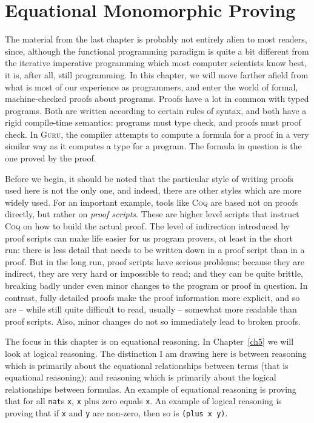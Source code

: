 \documentclass{book}[12pt]
\newcommand{\guru}[0]{\textsc{Guru}\xspace}
\begin{document}
\chapter{Equational Monomorphic Proving}
\label{ch2}

The material from the last chapter is probably not entirely alien to
most readers, since, although the functional programming paradigm is
quite a bit different from the iterative imperative programming which
most computer scientists know best, it is, after all, still
programming.  In this chapter, we will move farther afield from what
is most of our experience as programmers, and enter the world of
formal, machine-checked proofs about programs.  Proofs have a lot in
common with typed programs.  Both are written according to certain
rules of syntax, and both have a rigid compile-time semantics:
programs must type check, and proofs must proof check.  In \guru, the
compiler attempts to compute a formula for a proof in a very similar
way as it computes a type for a program.  The formula in question is
the one proved by the proof.

Before we begin, it should be noted that the particular style of
writing proofs used here is not the only one, and indeed, there are
other styles which are more widely used.  For an important example,
tools like \textsc{Coq} are based not on proofs directly, but rather
on \emph{proof scripts}.  These are higher level scripts that instruct
\textsc{Coq} on how to build the actual proof.  The level of
indirection introduced by proof scripts can make life easier for us
program provers, at least in the short run: there is less detail that
needs to be written down in a proof script than in a proof.  But in
the long run, proof scripts have serious problems: because they are
indirect, they are very hard or impossible to read; and they can be
quite brittle, breaking badly under even minor changes to the program
or proof in question.  In contrast, fully detailed proofs make the
proof information more explicit, and so are -- while still quite
difficult to read, usually -- somewhat more readable than proof
scripts.  Also, minor changes do not so immediately lead to broken
proofs.

The focus in this chapter is on equational reasoning.  In
Chapter~\ref{ch5} we will look at logical reasoning.  The distinction
I am drawing here is between reasoning which is primarily about the
equational relationships between terms (that is equational reasoning);
and reasoning which is primarily about the logical relationships
between formulas.  An example of equational reasoning is proving that
for all \texttt{nat}s \texttt{x}, \texttt{x} plus zero equals
\texttt{x}.  An example of logical reasoning is proving that if
\texttt{x} and \texttt{y} are non-zero, then so is \texttt{(plus x
y)}.
\end{document}

